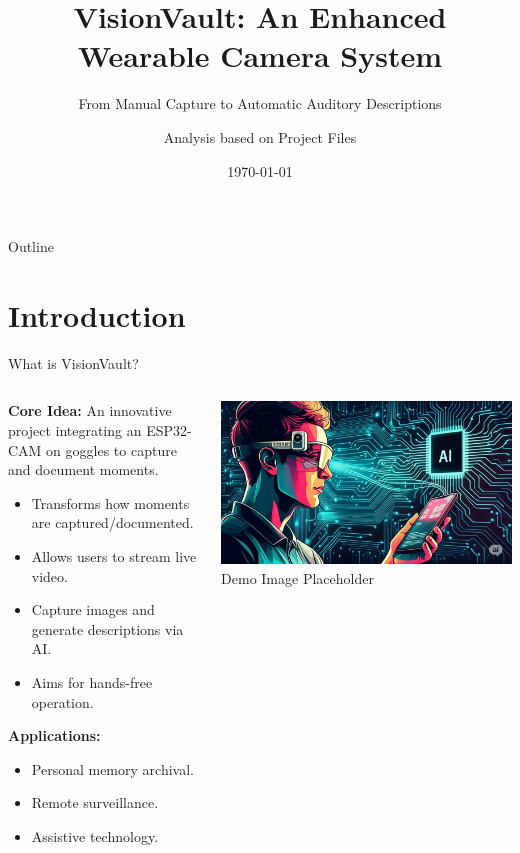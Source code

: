 \documentclass{beamer}
\title{VisionVault: An Enhanced Wearable Camera System}
\subtitle{From Manual Capture to Automatic Auditory Descriptions}
\author{Analysis based on Project Files}
\date{\today}
\institute{Project Overview}
\begin{document}
\begin{frame}
  \titlepage
\end{frame}

\begin{frame}{Outline}
  \tableofcontents
\end{frame}

\section{Introduction}

\begin{frame}{What is VisionVault?}
  \begin{columns}[T] %
    \begin{column}{0.6\textwidth}
      \textbf{Core Idea:} An innovative project integrating an ESP32-CAM on goggles to capture and document moments.
      \vspace{1em}
      \begin{itemize}
        \item Transforms how moments are captured/documented.
        \item Allows users to stream live video.
        \item Capture images and generate descriptions via AI.
        \item Aims for hands-free operation.
      \end{itemize}
       \vspace{1em}
       \textbf{Applications:}
       \begin{itemize}
        \item Personal memory archival.
        \item Remote surveillance.
        \item Assistive technology.
      \end{itemize}
    \end{column}
    \begin{column}{0.4\textwidth}
      \centering
      \includegraphics[width=\linewidth]{"vision vault.jpeg"} \\ %
      \tiny Demo Image Placeholder
    \end{column}
  \end{columns}
\end{frame}
\end{document}
